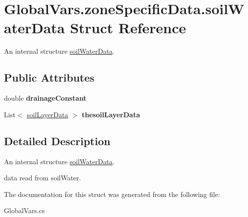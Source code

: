 \hypertarget{struct_global_vars_1_1zone_specific_data_1_1soil_water_data}{}\section{Global\+Vars.\+zone\+Specific\+Data.\+soil\+Water\+Data Struct Reference}
\label{struct_global_vars_1_1zone_specific_data_1_1soil_water_data}


An internal structure \mbox{\hyperlink{struct_global_vars_1_1zone_specific_data_1_1soil_water_data}{soil\+Water\+Data}}.  


\subsection*{Public Attributes}
\begin{DoxyCompactItemize}
\item 
\mbox{\label{struct_global_vars_1_1zone_specific_data_1_1soil_water_data_a7fe5c99bc76b68b06a424bf37f055d62}} 
double {\bfseries drainage\+Constant}
\item 
\mbox{\label{struct_global_vars_1_1zone_specific_data_1_1soil_water_data_a0dd1174e86427d3c82c8c23021b55edf}} 
List$<$ \mbox{\hyperlink{struct_global_vars_1_1zone_specific_data_1_1soil_layer_data}{soil\+Layer\+Data}} $>$ {\bfseries thesoil\+Layer\+Data}
\end{DoxyCompactItemize}


\subsection{Detailed Description}
An internal structure \mbox{\hyperlink{struct_global_vars_1_1zone_specific_data_1_1soil_water_data}{soil\+Water\+Data}}. 

data read from soil\+Water. 

The documentation for this struct was generated from the following file\+:\begin{DoxyCompactItemize}
\item 
Global\+Vars.\+cs\end{DoxyCompactItemize}

